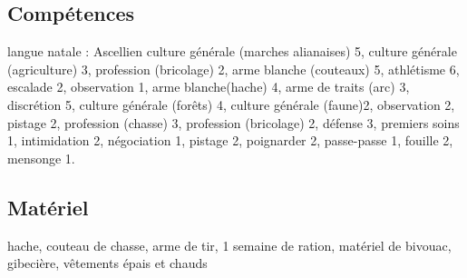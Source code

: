 \documentclass[10pt,a4paper]{article}
\begin{document}
\subsection{Compétences}
langue natale : Ascellien
culture générale (marches alianaises) 5, culture générale (agriculture) 3, profession (bricolage) 2, arme blanche (couteaux) 5, athlétisme 6, escalade 2, observation 1, arme blanche(hache) 4, arme de traits (arc) 3, discrétion 5, culture générale (forêts) 4, culture générale (faune)2, observation 2, pistage 2, profession (chasse) 3, profession (bricolage) 2, défense 3, premiers soins 1, intimidation 2, négociation 1, pistage 2, poignarder 2, passe-passe 1, fouille 2, mensonge 1.
\subsection{Matériel}
hache, couteau de chasse, arme de tir, 1 semaine de ration, matériel de bivouac, gibecière, vêtements épais et chauds
\end{document}
